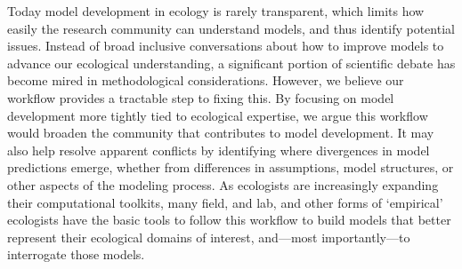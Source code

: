 \documentclass[11pt]{article}
\begin{document}
Today model development in ecology is rarely transparent, which limits how easily the research community can understand models, and thus identify potential issues. Instead of broad inclusive conversations about how to improve models to advance our ecological understanding, a significant portion of scientific debate has become mired in methodological considerations. However, we believe our workflow provides a tractable step to fixing this. By focusing on model development more tightly tied to ecological expertise, we argue this workflow would broaden the community that contributes to model development. It may also help resolve apparent conflicts by identifying where divergences in model predictions emerge, whether from differences in assumptions, model structures, or other aspects of the modeling process.
As ecologists are increasingly expanding their computational toolkits, many field, and lab, and other forms of `empirical' ecologists have the basic tools to follow this workflow to build models that better represent their ecological domains of interest, and---most importantly---to interrogate those models.


\clearpage

\end{document}
